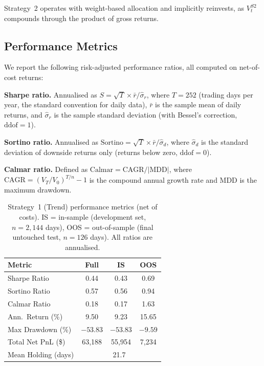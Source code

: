 \documentclass[11pt,a4paper]{article}
\newcommand{\abs}[1]{\lvert #1 \rvert}
\begin{document}
Strategy~2 operates with weight-based allocation and implicitly reinvests, as $V^{S2}_t$ compounds through the product of gross returns.

\subsection{Performance Metrics}

We report the following risk-adjusted performance ratios, all computed on net-of-cost returns:

\textbf{Sharpe ratio.} Annualised as $S = \sqrt{T} \times \bar{r} / \hat{\sigma}_r$, where $T = 252$ (trading days per year, the standard convention for daily data), $\bar{r}$ is the sample mean of daily returns, and $\hat{\sigma}_r$ is the sample standard deviation (with Bessel's correction, $\text{ddof} = 1$).

\textbf{Sortino ratio.} Annualised as $\text{Sortino} = \sqrt{T} \times \bar{r} / \hat{\sigma}_d$, where $\hat{\sigma}_d$ is the standard deviation of downside returns only (returns below zero, $\text{ddof} = 0$).

\textbf{Calmar ratio.} Defined as $\text{Calmar} = \text{CAGR} / \abs{\text{MDD}}$, where $\text{CAGR} = (V_T / V_0)^{T/n} - 1$ is the compound annual growth rate and MDD is the maximum drawdown.

\begin{table}[H]
  \centering
  \caption{Strategy~1 (Trend) performance metrics (net of costs).  IS = in-sample (development set, $n = 2{,}144$ days), OOS = out-of-sample (final untouched test, $n = 126$ days).  All ratios are annualised.}
  \label{tab:perf-s1}
  \begin{tabular}{lccc}
    \toprule
    Metric & Full & IS & OOS \\
    \midrule
    Sharpe Ratio            & 0.44  & 0.43  & 0.69  \\
    Sortino Ratio           & 0.57  & 0.56  & 0.94  \\
    Calmar Ratio            & 0.18  & 0.17  & 1.63  \\
    Ann.\ Return (\%)       & 9.50  & 9.23  & 15.65 \\
    Max Drawdown (\%)       & $-53.83$ & $-53.83$ & $-9.59$ \\
    Total Net PnL (\$)      & 63{,}188 & 55{,}954 & 7{,}234 \\
    Mean Holding (days)     & \multicolumn{3}{c}{21.7}  \\
    \bottomrule
  \end{tabular}
\end{table}
\end{document}
